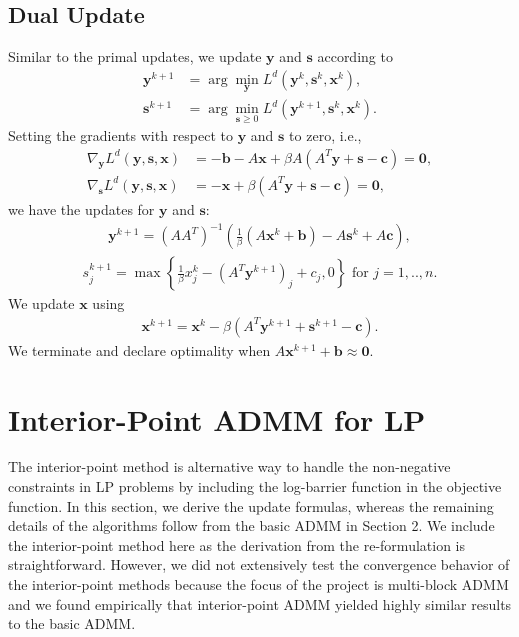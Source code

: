 \documentclass{article}
\begin{document}
\subsection*{Dual Update}
Similar to the primal updates, we update $\mathbf{y}$ and $\mathbf{s}$ according to 
\begin{align}
\mathbf{y}^{k+1} & = \arg \min_{\mathbf{y}} L^{d}(\mathbf{y}^{k},\mathbf{s}^k, \mathbf{x}^{k}),\\
\mathbf{s}^{k+1} & = \arg \min_{\mathbf{s} \geq 0} L^{d}(\mathbf{y}^{k+1},\mathbf{s}^k,\mathbf{x}^{k}).
\end{align}
Setting the gradients with respect to $\mathbf{y}$ and $\mathbf{s}$ to zero, i.e.,
\begin{align}
\nabla_{\mathbf{y}}L^{d}(\mathbf{y},\mathbf{s},\mathbf{x}) & =  -\mathbf{b}-A\mathbf{x}+\beta A\left(A^{T}\mathbf{y}+\mathbf{s}-\mathbf{c}\right)  = \mathbf{0}, \label{eq:dual_y} \\
\nabla_{\mathbf{s}}L^{d}(\mathbf{y},\mathbf{s},\mathbf{x}) & =  -\mathbf{x}+\beta\left(A^{T}\mathbf{y}+\mathbf{s}-\mathbf{c}\right) =  \mathbf{0},
\end{align}
we have the updates for $\mathbf{y}$ and $\mathbf{s}$:
\begin{align}\label{eq:y_dual_update}
\mathbf{y}^{k+1} = \left(AA^{T}\right)^{-1}\left(\frac{1}{\beta}\left(A\mathbf{x}^{k}+\mathbf{b}\right)-A\mathbf{s}^{k}+A\mathbf{c}\right),
\end{align}
\begin{align}\label{eq:s_dual_update}
s_j^{k+1} = \max\left\{ \frac{1}{\beta}{x}_j^k-(A^{T}\mathbf{y}^{k+1})_j+{c}_j,0\right\}  \text{ for $j = 1,..,n$}.
\end{align}
We update $\mathbf{x}$ using
\begin{align}\label{eq:x_dual_update}
\mathbf{x}^{k+1} = \mathbf{x}^k - \beta\left(A^T \mathbf{y}^{k+1} + \mathbf{s}^{k+1} - \mathbf{c}\right).
\end{align}
We terminate and declare optimality when $A \mathbf{x}^{k+1} + \mathbf{b} \approx \mathbf{0}$.


\vspace{0.2in}
\section{Interior-Point ADMM for LP}
The interior-point method is alternative way to handle the non-negative constraints in LP problems by including the log-barrier function in the objective function. In this section, we derive the update formulas, whereas the remaining details of the algorithms follow from the basic ADMM in Section 2.  We include the interior-point method here as the derivation from the re-formulation is straightforward. However, we did not extensively test the convergence behavior of the interior-point methods because the focus of the project is multi-block ADMM and we found empirically that interior-point ADMM yielded highly similar results to the basic ADMM.
\end{document}
